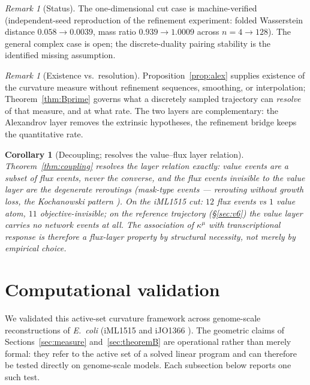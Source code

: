\documentclass[11pt,a4paper]{article}
\theoremstyle{plain}
\newtheorem{corollary}[theorem]{Corollary}
\theoremstyle{definition}
\theoremstyle{remark}
\newtheorem{remark}[theorem]{Remark}
\newcommand{\kmu}{\kappa^{\mu}}
\begin{document}
\begin{remark}[Status]
The one-dimensional cut case is machine-verified (independent-seed
reproduction of the refinement experiment: folded Wasserstein distance
$0.058 \to 0.0039$, mass ratio $0.939 \to 1.0009$ across
$n = 4 \to 128$). The general complex case is open; the discrete-duality
pairing stability is the identified missing assumption.
\end{remark}

\begin{remark}[Existence vs.\ resolution]
Proposition~\ref{prop:alex} supplies existence of the curvature measure
without refinement sequences, smoothing, or interpolation; Theorem~\ref{thm:Bprime} governs what a discretely sampled trajectory can \emph{resolve} of that
measure, and at what rate. The two layers are complementary: the
Alexandrov layer removes the extrinsic hypotheses, the refinement
bridge keeps the quantitative rate.
\end{remark}

\begin{corollary}[Decoupling; resolves the value--flux layer
relation]\label{cor:valueflux}
Theorem~\ref{thm:coupling} resolves the layer relation exactly: value
events are a subset of flux events, never the converse, and the flux
events invisible to the value layer are the degenerate reroutings
(mask-type events --- rerouting without growth loss, the Kochanowski pattern \citep{kochanowski2013}). On the iML1515 cut: $12$ flux events vs $1$ value atom, $11$ objective-invisible; on the reference trajectory (\S\ref{sec:v6}) the
value layer carries no network events at all. The association of
$\kmu$ with transcriptional response is therefore a flux-layer
property by structural necessity, not merely by empirical choice.
\end{corollary}

\section{Computational validation}\label{sec:computational}

We validated this active-set curvature framework across genome-scale
reconstructions of \emph{E.~coli} (iML1515 \citep{monk2017} and
iJO1366 \citep{orth2011}). The geometric claims of
Sections~\ref{sec:measure} and~\ref{sec:theoremB} are operational
rather than merely formal: they refer to the active set of a solved
linear program and can therefore be tested directly on genome-scale
models. Each subsection below reports one such test.
\end{document}
